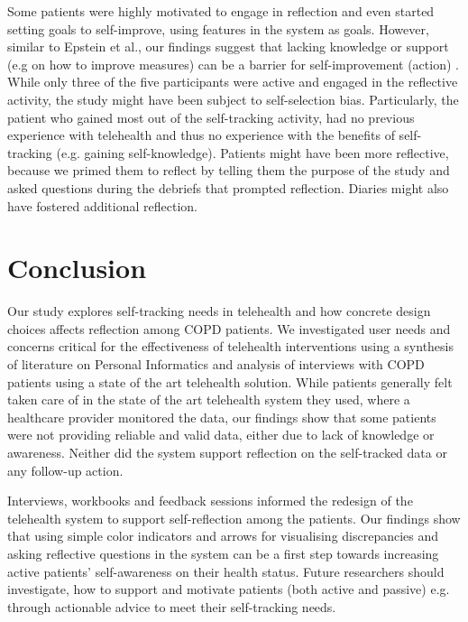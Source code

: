 Some patients were highly motivated to engage in reflection and even started setting goals to self-improve, using features in the system as goals. However, similar to Epstein et al., our findings suggest that lacking knowledge or support (e.g on how to improve measures) can be a barrier for self-improvement (action) \cite{Epstein2015}. While only three of the five participants were active and engaged in the reflective activity, the study might have been subject to self-selection bias. Particularly, the patient who gained most out of the self-tracking activity, had no previous experience with telehealth and thus no experience with the benefits of self-tracking (e.g. gaining self-knowledge). Patients might have been more reflective, because we primed them to reflect by telling them the purpose of the study and asked questions during the debriefs that prompted reflection. Diaries might also have fostered additional reflection. 
 
\section{Conclusion}
Our study explores self-tracking needs in telehealth and how concrete design choices affects reflection among COPD patients. We investigated user needs and concerns critical for the effectiveness of telehealth interventions using a synthesis of literature on Personal Informatics and analysis of interviews with COPD patients using a state of the art telehealth solution. While patients generally felt taken care of in the state of the art telehealth system they used, where a healthcare provider monitored the data, our findings show that some patients were not providing reliable and valid data, either due to lack of knowledge or awareness. Neither did the system support reflection on the self-tracked data or any follow-up action. 

Interviews, workbooks and feedback sessions informed the redesign of the telehealth system to support self-reflection among the patients. Our findings show that using simple color indicators and arrows for visualising discrepancies and asking reflective questions in the system can be a first step towards increasing active patients’ self-awareness on their health status. Future researchers should investigate, how to support and motivate patients (both active and passive) e.g. through actionable advice to meet their self-tracking needs. 
